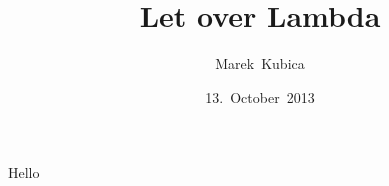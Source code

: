 

\title{Let over Lambda}
\author{Marek~Kubica}
\date{13.~October~2013}



{
  \frame{\titlepage}
}

\begin{frame}
  Hello
\end{frame}


